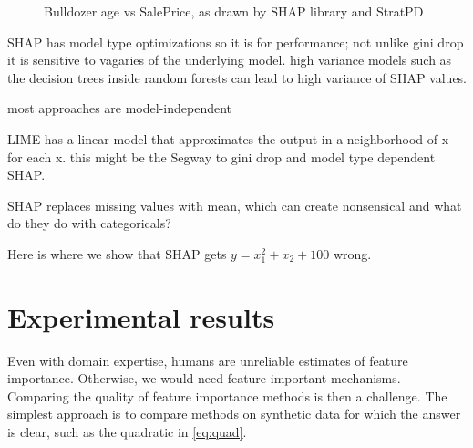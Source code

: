 \documentclass[twoside,11pt]{article}
\newcommand{\todo}[1]{{{\color{red}{[#1]}}}}
\begin{document}
\begin{figure}[htbp]
\begin{center}
\caption{Bulldozer age vs SalePrice, as drawn by SHAP library and StratPD}
\label{fig:shap-stratpd-age}
\end{center}
\end{figure}

SHAP has model type optimizations so it is for performance; not unlike gini drop it is sensitive to vagaries of the underlying model.  high variance models such as the decision trees inside random forests can lead to high variance of SHAP values.

most approaches are model-independent
 
LIME has a linear model that approximates the output in a neighborhood of x for each x. this might be the Segway to gini drop and model type dependent SHAP.

SHAP replaces missing values with mean, which can create nonsensical and what do they do with categoricals?

\todo{ do we need to mention LASSO?}

Here is where we show that SHAP gets $y = x_1^2 + x_2 + 100$ wrong.



\section{Experimental results}\label{sec:experiments}

\todo{an experiment where we show insensitive to noise column and any other codependent ones that are thrown in but don't affect y}

\todo{maybe show the linear 1 1 1 codependence example}

\todo{what about outlier example}

\todo{show impact vs importance}

\todo{RF vs GBM}

\todo{stability is valuable. users would not trust results that changed significantly for small data set changes. show our error bars from bootstrapping and say we can do p-values.}

\todo{bulldozer: YearMade ignores too much with stratpd, use catstrat}

Even with domain expertise, humans are unreliable estimates of feature importance. Otherwise, we would need feature important mechanisms. Comparing the quality of feature importance methods is then a challenge. The simplest approach is to compare methods on synthetic data for which the answer is clear, such as the quadratic in \ref{eq:quad}.
\end{document}
